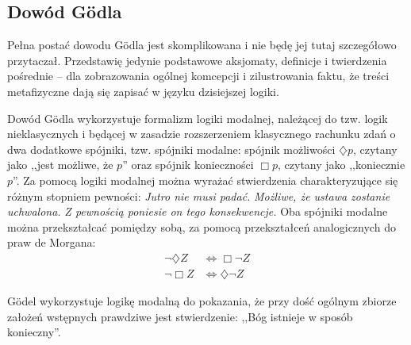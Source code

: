 \documentclass[12pt]{article}
\begin{document}
\begin{multicols}{2}
\section{Dowód G\"odla}
Pełna postać dowodu G\"odla jest skomplikowana i nie będę jej tutaj szczegółowo przytaczał. Przedstawię jedynie podstawowe aksjomaty, definicje i twierdzenia pośrednie -- dla zobrazowania ogólnej komcepcji i zilustrowania faktu, że treści metafizyczne dają się zapisać w języku dzisiejszej logiki. 

Dowód G\"odla wykorzystuje formalizm logiki modalnej, należącej do tzw. logik nieklasycznych i będącej w zasadzie rozszerzeniem klasycznego rachunku zdań o dwa dodatkowe spójniki, tzw. spójniki modalne: spójnik możliwości $\diamondsuit p$, czytany jako ,,jest możliwe, że $p$'' oraz spójnik konieczności $\Box p$, czytany jako ,,koniecznie $p$''. Za pomocą logiki modalnej można wyrażać stwierdzenia charakteryzujące się różnym stopniem pewności: \emph{Jutro nie musi padać.} \emph{Możliwe, że ustawa zostanie uchwalona.} \emph{Z pewnością poniesie on tego konsekwencje. } Oba spójniki modalne można przekształcać pomiędzy sobą, za pomocą przekształceń analogicznych do praw de Morgana:
\begin{align*}
\neg \diamondsuit Z & \Leftrightarrow \Box \neg Z \\ 
\neg \Box Z & \Leftrightarrow \diamondsuit \neg Z
\end{align*}
		
G\"odel wykorzystuje logikę modalną do pokazania, że przy dość ogólnym zbiorze założeń wstępnych prawdziwe jest stwierdzenie: ,,Bóg istnieje w sposób konieczny''. 


\end{multicols}
\end{document}
